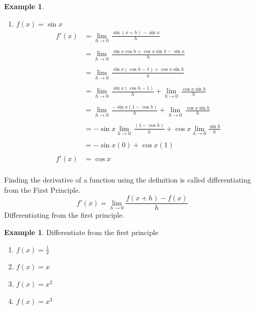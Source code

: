 \documentclass[11pt,a4paper]{article}
\theoremstyle{definition}
\newtheorem{example}[thm]{Example}
\begin{document}
\begin{example}
\begin{enumerate}
\item[(ii).] $f(x)=\sin x$
\begin{align*}
f'(x) & = \lim_{h \longrightarrow 0} \, \frac{\sin (x+h)-\sin x}{h}\\\\
& = \lim_{h \longrightarrow 0}\, \frac{\sin x\cos h+\cos x\sin h-\sin x}{h}\\\\
& = \lim_{h \longrightarrow 0}\,\frac{\sin x(\cos h -1)+\cos x\sin h}{h}\\\\
& = \lim_{h \longrightarrow 0}\, \frac{\sin x (\cos h-1)}{h} + \lim_{h \longrightarrow 0} \, \frac{\cos x \sin h}{h}\\\\
& = \lim_{h \longrightarrow 0}\,\frac{- \sin x (1-\cos h)}{h} + \lim_{h \longrightarrow 0} \,\frac{\cos x \sin h}{h}\\\\
& = -\sin x \lim_{h \longrightarrow 0}\, \frac{(1-\cos h)}{h}+ \cos x \lim_{h \longrightarrow 0} \frac{\sin h}{h}\\\\
& = -\sin x (0) + \cos x (1)\\\\
f'(x) &=\cos x\\
\end{align*}
\end{enumerate}




Finding the derivative of a function using the definition is called differentiating from the First Principle. $$f'(x)=\lim _{h \longrightarrow 0} \frac{f(x+h)-f(x)}{h}$$ 
Differentiating from the first principle.\\
\end{example}
\begin{example}

Differentiate from the first principle
\begin{enumerate}
\item $f(x)=\frac{1}{x}$
\item $f(x)=x$
\item $f(x)=x^2$
\item $f(x)=x^3$
\end{enumerate}
\end{example}
\end{document}
